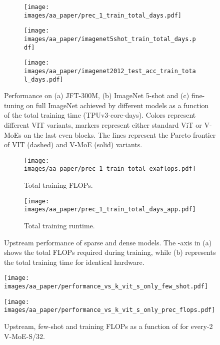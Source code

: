 \documentclass{article}
\newcommand{\abbv}{{V-MoE}}
\begin{document}
\begin{figure}
\centering
\begin{subfigure}{.3\textwidth}
  \centering
  \texttt{[image: images/aa\_paper/prec\_1\_train\_total\_days.pdf]}
  \caption{}
  \label{im:upstream_vs_days}
\end{subfigure}\begin{subfigure}{.3\textwidth}
  \centering
  \texttt{[image: images/aa\_paper/imagenet5shot\_train\_total\_days.pdf]}
  \caption{}
  \label{im:imagenet5shot_vs_days}
\end{subfigure}
\begin{subfigure}{.3\textwidth}
  \centering
  \texttt{[image: images/aa\_paper/imagenet2012\_test\_acc\_train\_total\_days.pdf]}
  \caption{}
  \label{im:imagenet_finetune_vs_days}
\end{subfigure}
\caption{Performance on (a) JFT-300M, (b) ImageNet 5-shot and (c) fine-tuning on full ImageNet achieved by different models as a function of the total training time (TPUv3-core-days).
Colors represent different VIT variants, markers represent either standard ViT or V-MoEs on the last  even blocks.
The lines represent the Pareto frontier of VIT (dashed) and V-MoE (solid) variants.}
\label{im:performance_vs_days}
\end{figure}




\begin{figure}
\centering
\begin{subfigure}{.50\textwidth}
  \centering
  \texttt{[image: images/aa\_paper/prec\_1\_train\_total\_exaflops.pdf]}
  \caption{Total training FLOPs.}
  \label{im:upstream_vs_model_flops}
\end{subfigure}\begin{subfigure}{.50\textwidth}
  \centering
  \texttt{[image: images/aa\_paper/prec\_1\_train\_total\_days\_app.pdf]}
  \caption{Total training runtime.}
  \label{im:upstream_vs_model_runtime_app}
\end{subfigure}
\caption{Upstream performance of sparse and dense models.
The -axis in (a) shows the total FLOPs required during training, while (b) represents the total training time for identical hardware. 
}
\label{im:upstream_vs_model}
\end{figure}


\begin{figure}[tb]
\centering
\texttt{[image: images/aa\_paper/performance\_vs\_k\_vit\_s\_only\_few\_shot.pdf]}
\caption{Upstream, few-shot and training FLOPs as a function of  for every-2 \abbv{}-S/32.}
\texttt{[image: images/aa\_paper/performance\_vs\_k\_vit\_s\_only\_prec\_flops.pdf]}
\label{im:performance_increasing_k}
\end{figure}
\end{document}
